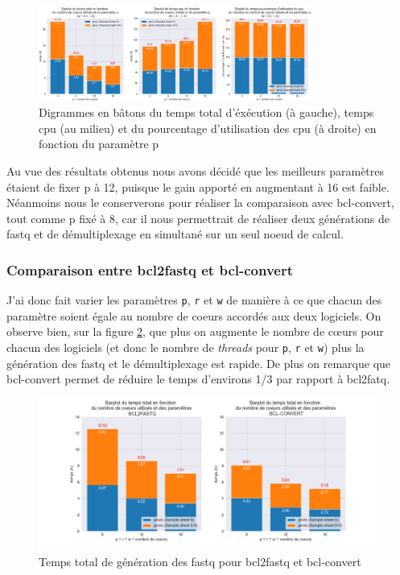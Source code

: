 \begin{figure}[H]
    \centering
    \includegraphics[width=0.8\textwidth]{img/barplot_cum_jarvis1.png}
    \caption{\footnotesize{Digrammes en bâtons du temps total d'éxécution (à gauche), temps cpu (au milieu) et du pourcentage d'utilisation des cpu (à droite) en fonction du paramètre p}}
    \label{barplot-param2}
\end{figure}

Au vue des résultats obtenus nous avons décidé que les meilleurs paramètres étaient de fixer p à 12, puisque le gain apporté en augmentant à 16 est faible. Néanmoins nous le conserverons pour réaliser la comparaison avec bcl-convert, tout comme p fixé à 8, car il nous permettrait de réaliser deux générations de fastq et de démultiplexage en simultané sur un seul noeud de calcul.\\

\subsubsection{Comparaison entre bcl2fastq et bcl-convert}
J'ai donc fait varier les paramètres \texttt{p}, \texttt{r} et \texttt{w} de manière à ce que chacun des paramètre soient égale au nombre de coeurs accordés aux deux logiciels. On observe bien, sur la figure \ref{fig-total-time}, que plus on augmente le nombre de cœurs pour chacun des logiciels (et donc le nombre de \emph{threads} pour \texttt{p}, \texttt{r} et \texttt{w}) plus la génération des fastq et le démultiplexage est rapide. De plus on remarque que bcl-convert permet de réduire le temps d'environs 1/3 par rapport à bcl2fatq. 

\begin{figure}[H]
    \centering
    \includegraphics[width=1\textwidth]{img/barplot_total_time_comp.png}
    \caption{\footnotesize{Temps total de génération des fastq pour bcl2fastq et bcl-convert}}
    \label{fig-total-time}
\end{figure}


